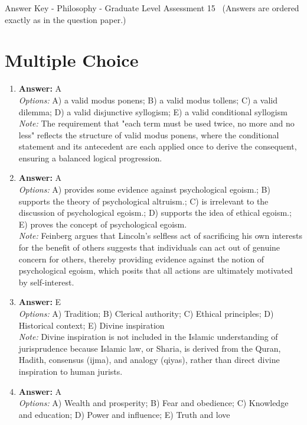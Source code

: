 \documentclass[12pt]{article}
\begin{document}
\begin{center}
Answer Key - Philosophy - Graduate Level Assessment 15 \
\small (Answers are ordered exactly as in the question paper.)
\end{center}

\section*{Multiple Choice}
\begin{enumerate}[label=\arabic*.]
\item \textbf{Answer:} A
\\ \textit{Options:} A) a valid modus ponens; B) a valid modus tollens; C) a valid dilemma; D) a valid disjunctive syllogism; E) a valid conditional syllogism
\\ \textit{Note:} The requirement that "each term must be used twice, no more and no less" reflects the structure of valid modus ponens, where the conditional statement and its antecedent are each applied once to derive the consequent, ensuring a balanced logical progression.
\item \textbf{Answer:} A
\\ \textit{Options:} A) provides some evidence against psychological egoism.; B) supports the theory of psychological altruism.; C) is irrelevant to the discussion of psychological egoism.; D) supports the idea of ethical egoism.; E) proves the concept of psychological egoism.
\\ \textit{Note:} Feinberg argues that Lincoln's selfless act of sacrificing his own interests for the benefit of others suggests that individuals can act out of genuine concern for others, thereby providing evidence against the notion of psychological egoism, which posits that all actions are ultimately motivated by self-interest.
\item \textbf{Answer:} E
\\ \textit{Options:} A) Tradition; B) Clerical authority; C) Ethical principles; D) Historical context; E) Divine inspiration
\\ \textit{Note:} Divine inspiration is not included in the Islamic understanding of jurisprudence because Islamic law, or Sharia, is derived from the Quran, Hadith, consensus (ijma), and analogy (qiyas), rather than direct divine inspiration to human jurists.
\item \textbf{Answer:} A
\\ \textit{Options:} A) Wealth and prosperity; B) Fear and obedience; C) Knowledge and education; D) Power and influence; E) Truth and love

\end{enumerate}
\end{document}
